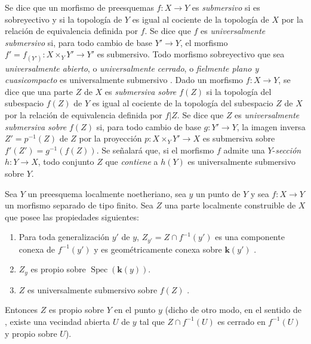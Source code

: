 \begin{env}[15.7.8]
\label{IV.15.7.8}
Se dice que un morfismo de preesquemas $f:X\to Y$ es \emph{submersivo} si es sobreyectivo y si la topología de $Y$ es igual al cociente de la topología de $X$ por la relación de equivalencia definida por $f$.
Se dice que $f$ es \emph{universalmente submersivo} si, para todo cambio de base $Y'\to Y$, el morfismo $f'=f_{(Y')}:X\times_Y Y'\to Y'$ es submersivo.
Todo morfismo sobreyectivo que sea \emph{universalmente abierto}, o \emph{universalmente cerrado}, o \emph{fielmente plano y cuasicompacto} es universalmente submersivo .
Dado un morfismo $f:X\to Y$, se dice que una parte $Z$ de $X$ es \emph{submersiva sobre $f(Z)$} si la topología del subespacio $f(Z)$ de $Y$ es igual al cociente de la topología del subespacio $Z$ de $X$ por la relación de equivalencia definida por $f|Z$.
Se dice que $Z$ es \emph{universalmente submersiva sobre $f(Z)$} si, para todo cambio de base $g:Y'\to Y$, la imagen inversa $Z'=p^{-1}(Z)$ de $Z$ por la proyección $p:X\times_Y Y'\to X$ es submersiva sobre $f'(Z')=g^{-1}(f(Z))$.
Se señalará que, si el morfismo $f$ admite una $Y$-\emph{sección} $h:Y\to X$, todo conjunto $Z$ que \emph{contiene} a $h(Y)$ es universalmente submersivo sobre $Y$.
\end{env}

\begin{proposition}[15.7.9]
\label{IV.15.7.9}
Sea $Y$ un preesquema localmente noetheriano, sea $y$ un punto de $Y$ y sea $f:X\to Y$ un morfismo separado de tipo finito.
Sea $Z$ una parte localmente construible de $X$ que posee las propiedades siguientes:
\begin{enumerate}[label=(\roman*)]
  \item Para toda generalización $y'$ de $y$, $Z_{y'}=Z\cap f^{-1}(y')$ es una componente conexa de $f^{-1}(y')$ y es geométricamente conexa sobre $\boldsymbol{k}(y')$ .
  \item $Z_y$ es propio sobre $\operatorname{Spec}(\boldsymbol{k}(y))$.
  \item $Z$ es universalmente submersivo sobre $f(Z)$ .
\end{enumerate}
Entonces $Z$ es propio sobre $Y$ en el punto $y$ (dicho de otro modo, en el sentido de , existe una vecindad abierta $U$ de $y$ tal que $Z\cap f^{-1}(U)$ es cerrado en $f^{-1}(U)$ y propio sobre $U$).
\end{proposition}

